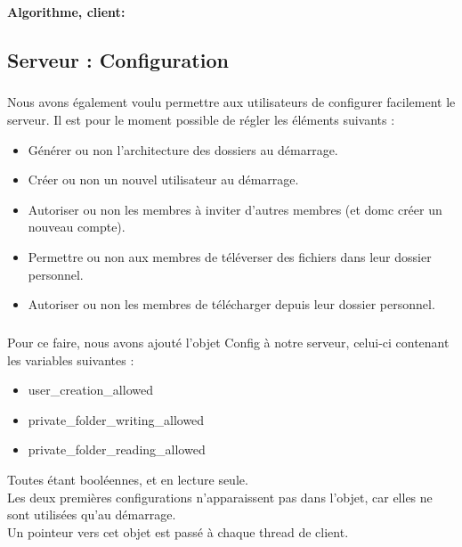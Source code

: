 \documentclass[12pt,a4paper,twoside]{article}
\begin{document}
			\paragraph*{Algorithme, client:}
				
		\subsection{Serveur : Configuration} %
			\subparagraph*{}
				Nous avons également voulu permettre aux utilisateurs de configurer facilement le serveur. Il est pour le moment possible de régler les éléments suivants :
				\begin{itemize}
					\item{} Générer ou non l'architecture des dossiers au démarrage.
					\item{} Créer ou non un nouvel utilisateur au démarrage.
					\item{} Autoriser ou non les membres à inviter d'autres membres (et domc créer un nouveau compte).
					\item{} Permettre ou non aux membres de téléverser des fichiers dans leur dossier personnel.
					\item{} Autoriser ou non les membres de télécharger depuis leur dossier personnel.
				\end{itemize}
			\subparagraph*{}
				Pour ce faire, nous avons ajouté l'objet Config à notre serveur, celui-ci contenant les variables suivantes :
				\begin{itemize}
					\item{} user\_creation\_allowed
					\item{} private\_folder\_writing\_allowed
					\item{} private\_folder\_reading\_allowed
				\end{itemize}
				Toutes étant booléennes, et en lecture seule.\\
				Les deux premières configurations n'apparaissent pas dans l'objet, car elles ne sont utilisées qu'au démarrage.\\
				Un pointeur vers cet objet est passé à chaque thread de client.
\end{document}
